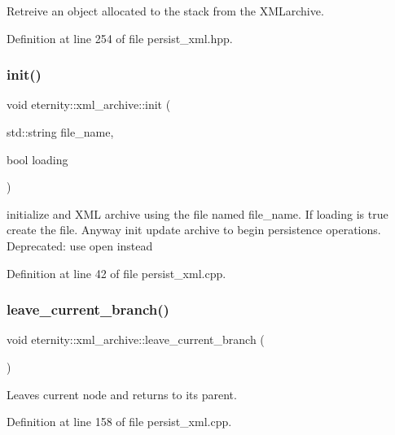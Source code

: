 Retreive an object allocated to the stack from the X\+M\+Larchive. 



Definition at line 254 of file persist\+\_\+xml.\+hpp.

\mbox{\label{classeternity_1_1xml__archive_a27ed416689f3c9da532fcb91eed88217}} 
\subsubsection{\texorpdfstring{init()}{init()}}
{\footnotesize\ttfamily void eternity\+::xml\+\_\+archive\+::init (\begin{DoxyParamCaption}\item[{std\+::string}]{file\+\_\+name,  }\item[{bool}]{loading }\end{DoxyParamCaption})}

initialize and X\+ML archive using the file named file\+\_\+name. If loading is true create the file. Anyway init update archive to begin persistence operations. Deprecated\+: use open instead 

Definition at line 42 of file persist\+\_\+xml.\+cpp.

\mbox{\label{classeternity_1_1xml__archive_ae15514bf5e058364d30faac3553e201b}} 
\subsubsection{\texorpdfstring{leave\+\_\+current\+\_\+branch()}{leave\_current\_branch()}}
{\footnotesize\ttfamily void eternity\+::xml\+\_\+archive\+::leave\+\_\+current\+\_\+branch (\begin{DoxyParamCaption}{ }\end{DoxyParamCaption})}



Leaves current node and returns to its parent. 



Definition at line 158 of file persist\+\_\+xml.\+cpp.

